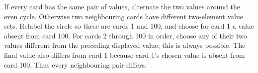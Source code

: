 If every card has the same pair of values, alternate the two values around the even cycle. Otherwise two neighbouring cards have different two-element value sets. Relabel the circle so these are cards 1 and 100, and choose for card 1 a value absent from card 100. For cards 2 through 100 in order, choose any of their two values different from the preceding displayed value; this is always possible. The final value also differs from card 1 because card 1's chosen value is absent from card 100. Thus every neighbouring pair differs.
